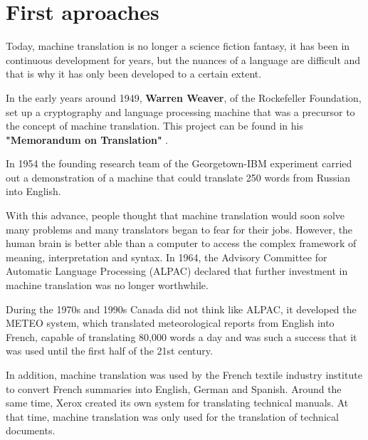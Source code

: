 \documentclass[a4paper]{article}
\theoremstyle{plain}
\theoremstyle{definition}
\begin{document}
	\section{First aproaches}
	\label{sec:examples}
	\begin{flushleft}
	Today, machine translation is no longer a science fiction fantasy, it has been in continuous development for years, but the nuances of a language are difficult and that is why it has only been developed to a certain extent.\par
	
	In the early years around 1949, \textbf{Warren Weaver}, of the Rockefeller Foundation, set up a cryptography and language processing machine that was a precursor to the concept of machine translation. This project can be found in his \textbf{"Memorandum on Translation"} .\par

    In 1954 the founding research team of the Georgetown-IBM experiment carried out a demonstration of a machine that could translate 250 words from Russian into English.\par
    
    With this advance, people thought that machine translation would soon solve many problems and many translators began to fear for their jobs. However, the human brain is better able than a computer to access the complex framework of meaning, interpretation and syntax. In 1964, the Advisory Committee for Automatic Language Processing (ALPAC) declared that further investment in machine translation was no longer worthwhile.\par

    During the 1970s and 1990s Canada did not think like ALPAC, it developed the METEO system, which translated meteorological reports from English into French, capable of translating 80,000 words a day and was such a success that it was used until the first half of the 21st century.\par\par\par
    
    In addition, machine translation was used by the French textile industry institute to convert French summaries into English, German and Spanish. Around the same time, Xerox created its own system for translating technical manuals. At that time, machine translation was only used for the translation of technical documents.\par\par


\end{flushleft}
\end{document}
